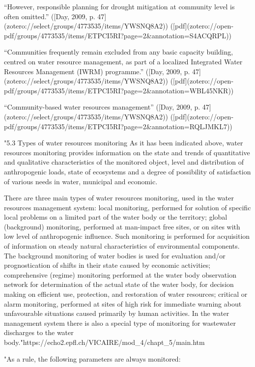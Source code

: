 “However, responsible planning for drought mitigation at community level is often omitted.” ([Day, 2009, p. 47](zotero://select/groups/4773535/items/YWSNQ8A2)) ([pdf](zotero://open-pdf/groups/4773535/items/ETPCI5RI?page=2&annotation=S4ACQRPL))

“Communities frequently remain excluded from any basic capacity building, centred on water resource management, as part of a localized Integrated Water Resources Management (IWRM) programme.” ([Day, 2009, p. 47](zotero://select/groups/4773535/items/YWSNQ8A2)) ([pdf](zotero://open-pdf/groups/4773535/items/ETPCI5RI?page=2&annotation=WBL45NKR))

“Community-based water resources management” ([Day, 2009, p. 47](zotero://select/groups/4773535/items/YWSNQ8A2)) ([pdf](zotero://open-pdf/groups/4773535/items/ETPCI5RI?page=2&annotation=RQLJMKL7))

"5.3 Types of water resources monitoring
As it has been indicated above, water resources monitoring provides information on the state and trends of quantitative and qualitative characteristics of the monitored object, level and distribution of anthropogenic loads, state of ecosystems and a degree of possibility of satisfaction of various needs in water, municipal and economic.

There are three main types of water resources monitoring, used in the water resources management system:
local monitoring, performed for solution of specific local problems on a limited part of the water body or the territory;
global (background) monitoring, performed at man-impact free sites, or on sites with low level of anthropogenic influence. Such monitoring is performed for acquisition of information on steady natural characteristics of environmental components. The background monitoring of water bodies is used for evaluation and/or prognostication of shifts in their state caused by economic activities;
comprehensive (regime) monitoring performed at the water body observation network for determination of the actual state of the water body, for decision making on efficient use, protection, and restoration of water resources;
critical or alarm monitoring, performed at sites of high risk for immediate warning about unfavourable situations caused primarily by human activities.
In the water management system there is also a special type of monitoring for wastewater discharges to the water body."https://echo2.epfl.ch/VICAIRE/mod_4/chapt_5/main.htm

"As a rule, the following parameters are always monitored:

